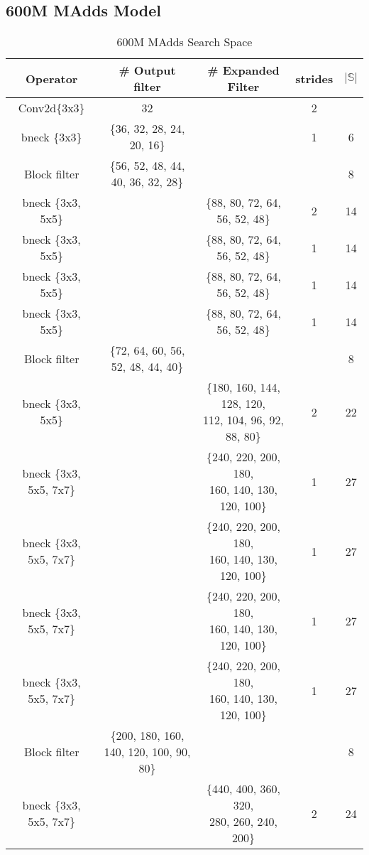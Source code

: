 \subsection{600M MAdds Model}


\begin{table}
\caption{600M MAdds Search Space} 
\begin{center}

\begin{tabular}[hp]{c|c|c|c|c}
\hline
\hline
 Operator  &\# Output filter &\# Expanded Filter &strides &$|\mathbb{S}|$\\ 
\hline
  Conv2d\{3x3\} &32 & &2 \\
\hline
  bneck \{3x3\} & \{36, 32, 28, 24, 20, 16\} & &1 &6 \\
\hline
  Block filter &\{56, 52, 48, 44, 40, 36, 32, 28\} & & &8 \\
  bneck \{3x3, 5x5\} & &\{88, 80, 72, 64, 56, 52, 48\} &2 &14 \\
  bneck \{3x3, 5x5\} & &\{88, 80, 72, 64, 56, 52, 48\} &1 &14 \\
  bneck \{3x3, 5x5\} & &\{88, 80, 72, 64, 56, 52, 48\} &1 &14 \\
  bneck \{3x3, 5x5\} & &\{88, 80, 72, 64, 56, 52, 48\} &1 &14 \\
\hline
Block filter &\{72, 64, 60, 56, 52, 48, 44, 40\} & & &8 \\
  bneck \{3x3, 5x5\} & &\shortstack{\{180, 160, 144, 128, 120, \\ 112, 104, 96, 92, 88, 80\}} &2 &22 \\
  bneck \{3x3, 5x5, 7x7\} & &\shortstack{\{240, 220, 200, 180, \\ 160, 140, 130, 120, 100\}} &1 &27 \\
  bneck \{3x3, 5x5, 7x7\} & &\shortstack{\{240, 220, 200, 180, \\160, 140, 130, 120, 100\}} &1 &27 \\
  bneck \{3x3, 5x5, 7x7\} & &\shortstack{\{240, 220, 200, 180, \\ 160, 140, 130, 120, 100\}} &1 &27 \\
  bneck \{3x3, 5x5, 7x7\} & &\shortstack{\{240, 220, 200, 180, \\ 160, 140, 130, 120, 100\}} &1 &27 \\
\hline
Block filter &\{200, 180, 160, 140, 120, 100, 90, 80\} & & &8 \\
  bneck \{3x3, 5x5, 7x7\} & &\shortstack{\{440, 400, 360, 320, \\280, 260, 240, 200\}} &2 &24 \\

\end{tabular}
\end{center}
\end{table}

